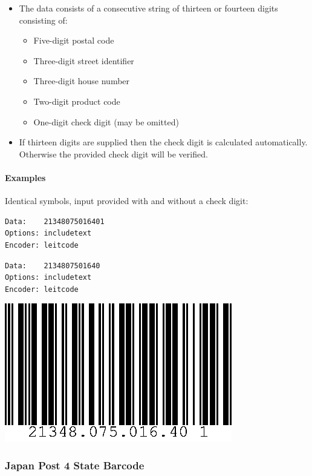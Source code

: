 \begin{itemize}
\tightlist
\item
  The data consists of a consecutive string of thirteen or fourteen
  digits consisting of:

  \begin{itemize}
  \tightlist
  \item
    Five-digit postal code
  \item
    Three-digit street identifier
  \item
    Three-digit house number
  \item
    Two-digit product code
  \item
    One-digit check digit (may be omitted)
  \end{itemize}
\item
  If thirteen digits are supplied then the check digit is calculated
  automatically. Otherwise the provided check digit will be verified.
\end{itemize}

\hypertarget{examples-33}{%
\paragraph{Examples}\label{examples-33}}

Identical symbols, input provided with and without a check digit:

\begin{verbatim}
Data:    21348075016401
Options: includetext
Encoder: leitcode
\end{verbatim}

\begin{verbatim}
Data:    2134807501640
Options: includetext
Encoder: leitcode
\end{verbatim}

\includegraphics{images/leitcode-1.eps}

\hypertarget{japan-post-4-state-barcode}{%
\subsubsection{Japan Post 4 State
Barcode}\label{japan-post-4-state-barcode}}

